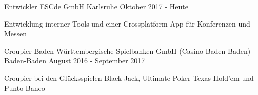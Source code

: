 


\begin{cventries}


\cventry
{Entwickler} %
{ESCde GmbH} %
{Karlsruhe} %
{Oktober 2017 - Heute} %
{ %
\begin{cvitems}
\item {Entwicklung interner Tools und einer Crossplatform App für Konferenzen und Messen}
\end{cvitems}
}

\cventry
{Croupier} %
{Baden-Württembergische Spielbanken GmbH (Casino Baden-Baden)} %
{Baden-Baden} %
{August 2016 - September 2017} %
{ %
\begin{cvitems}
\item {Croupier bei den Glücksspielen Black Jack, Ultimate Poker Texas Hold'em und Punto Banco}
\end{cvitems}
}

\end{cventries}